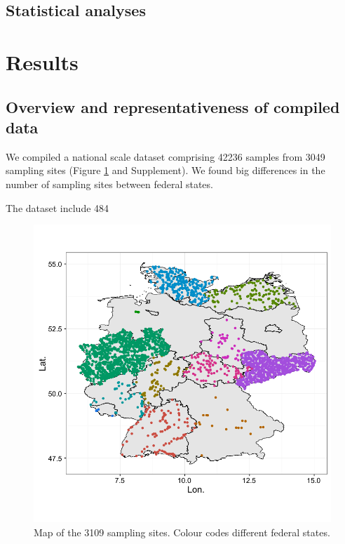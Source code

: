 \documentclass[journal=esthag,manuscript=article]{achemso}
\begin{document}
\subsection{Statistical analyses}




\section{Results}
\subsection{Overview and representativeness of compiled data}

We compiled a national scale dataset  comprising 42236 samples from 3049 sampling sites (Figure \ref{fig:fig1} and Supplement). 
We found big differences in the number of sampling sites between federal states.

The dataset include 484 



\begin{figure}
  \includegraphics[width=.8\textwidth]{fig/fig1.pdf}
  \caption{Map of the 3109 sampling sites. Colour codes different federal states.}
  \label{fig:fig1}
\end{figure}
\end{document}
